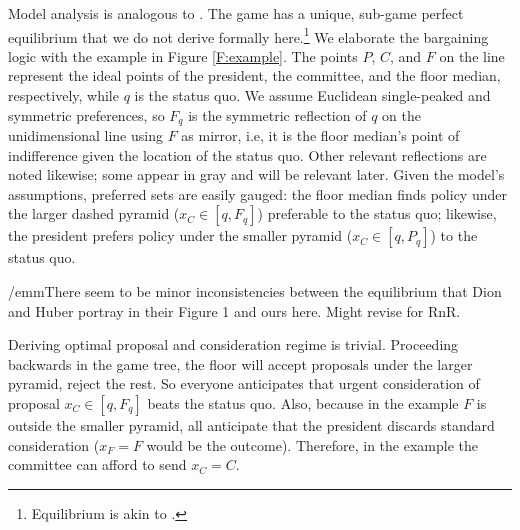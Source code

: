 \documentclass[letter,12pt]{article}
\begin{document}
Model analysis is analogous to \citet{dion.huber.1996}. The game has a unique, sub-game perfect equilibrium that we do not derive formally here.\footnote{Equilibrium is akin to \citet{magar.nd,romer.rosenthal.1978,cox.mccubbins.2005,gerber.1996}.} We elaborate the bargaining logic with the example in Figure \ref{F:example}. The points $P$, $C$, and $F$ on the line represent the ideal points of the president, the committee, and the floor median, respectively, while $q$ is the status quo. We assume Euclidean single-peaked and symmetric preferences, so $F_q$ is the symmetric reflection of $q$ on the unidimensional line using $F$ as mirror, i.e, it is the floor median's point of indifference given the location of the status quo. Other relevant reflections are noted likewise; some appear in gray and will be relevant later. Given the model's assumptions, preferred sets are easily gauged: the floor median finds policy under the larger dashed pyramid ($x_C \in [q,F_q]$) preferable to the status quo; likewise, the president prefers policy under the smaller pyramid ($x_C \in [q,P_q]$) to the status quo.


/emm{There seem to be minor inconsistencies between the equilibrium that Dion and Huber portray in their Figure 1 and ours here. Might revise for RnR.}

Deriving optimal proposal and consideration regime is trivial. Proceeding backwards in the game tree, the floor will accept proposals under the larger pyramid, reject the rest. So everyone anticipates that urgent consideration of proposal $x_C \in [q,F_q]$ beats the status quo. Also, because in the example $F$ is outside the smaller pyramid, all anticipate that the president discards standard consideration ($x_F=F$ would be the outcome). Therefore, in the example the committee can afford to send $x_C=C$.
\end{document}
